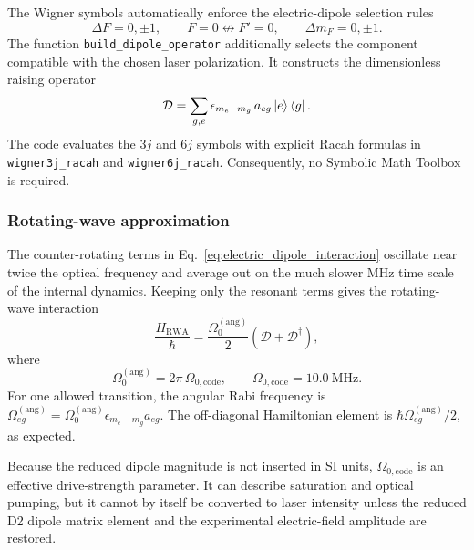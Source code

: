 The Wigner symbols automatically enforce the electric-dipole selection rules
\begin{equation}
\Delta F=0,\pm1,\qquad
F=0\not\leftrightarrow F'=0,\qquad
\Delta m_F=0,\pm1.
\label{eq:dipole_selection_rules}
\end{equation}
The function \texttt{build\_dipole\_operator} additionally selects the
component compatible with the chosen laser polarization.  It constructs the
dimensionless raising operator
\begin{equation}
\mathcal{D}
=
\sum_{g,e}
\epsilon_{m_e-m_g}\,a_{eg}\left|e\right\rangle\left\langle g\right|.
\label{eq:dimensionless_dipole_operator}
\end{equation}
The code evaluates the \(3j\) and \(6j\) symbols with explicit Racah formulas
in \texttt{wigner3j\_racah} and \texttt{wigner6j\_racah}.  Consequently, no
Symbolic Math Toolbox is required.

\subsubsection{Rotating-wave approximation}

The counter-rotating terms in Eq.~\eqref{eq:electric_dipole_interaction}
oscillate near twice the optical frequency and average out on the much slower
MHz time scale of the internal dynamics.  Keeping only the resonant terms
gives the rotating-wave interaction
\begin{equation}
\frac{H_{\mathrm{RWA}}}{\hbar}
=
\frac{\Omega_0^{(\mathrm{ang})}}{2}
\left(\mathcal{D}+\mathcal{D}^{\dagger}\right),
\label{eq:RWA_interaction}
\end{equation}
where
\begin{equation}
\Omega_0^{(\mathrm{ang})}
=2\pi\,\Omega_{0,\mathrm{code}},
\qquad
\Omega_{0,\mathrm{code}}=10.0~\mathrm{MHz}.
\end{equation}
For one allowed transition, the angular Rabi frequency is
\(\Omega_{eg}^{(\mathrm{ang})}
=\Omega_0^{(\mathrm{ang})}\epsilon_{m_e-m_g}a_{eg}\).
The off-diagonal Hamiltonian element is
\(\hbar\Omega_{eg}^{(\mathrm{ang})}/2\), as expected.

Because the reduced dipole magnitude is not inserted in SI units,
\(\Omega_{0,\mathrm{code}}\) is an effective drive-strength parameter.  It
can describe saturation and optical pumping, but it cannot by itself be
converted to laser intensity unless the reduced D2 dipole matrix element and
the experimental electric-field amplitude are restored.

